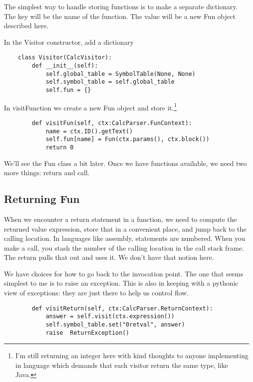 The simplest way to handle storing functions is to make a separate
dictionary. The key will be the name of the function. The value
will be a new Fun object described here.

In the Visitor constructor, add a dictionary

{\footnotesize
\begin{verbatim}
    class Visitor(CalcVisitor):
        def __init__(self):
            self.global_table = SymbolTable(None, None)
            self.symbol_table = self.global_table
            self.fun = {}
\end{verbatim}
}

In visitFunction we create a new Fun object and store
it.\footnote{I'm still returning an integer here with kind thoughts to
anyone implementing in language which demands that each visitor return
the same type, like Java.}

{\footnotesize
\begin{verbatim}
        def visitFun(self, ctx:CalcParser.FunContext):
            name = ctx.ID().getText()
            self.fun[name] = Fun(ctx.params(), ctx.block())
            return 0
\end{verbatim}
}

We'll see the Fun class a bit later. Once we have functions available,
we need two more things: return and call.

\subsection{Returning Fun}

When we encounter a return statement in a function, we need to compute
the returned value expression, store that in a convenient place,
and jump back to the calling location. In languages like assembly,
statements are numbered. When you make a call, you stash the number
of the calling location in the call stack frame. The return pulls that
out and uses it. We don't have that notion here.

We have choices for how to go back to the invocation point. The one
that seems simplest to me is to raise an exception. This is also in
keeping with a pythonic view of exceptions: they are just there
to help us control flow.

{\footnotesize
\begin{verbatim}
        def visitReturn(self, ctx:CalcParser.ReturnContext):
            answer = self.visit(ctx.expression())
            self.symbol_table.set("0retval", answer)
            raise  ReturnException()
\end{verbatim}
}

